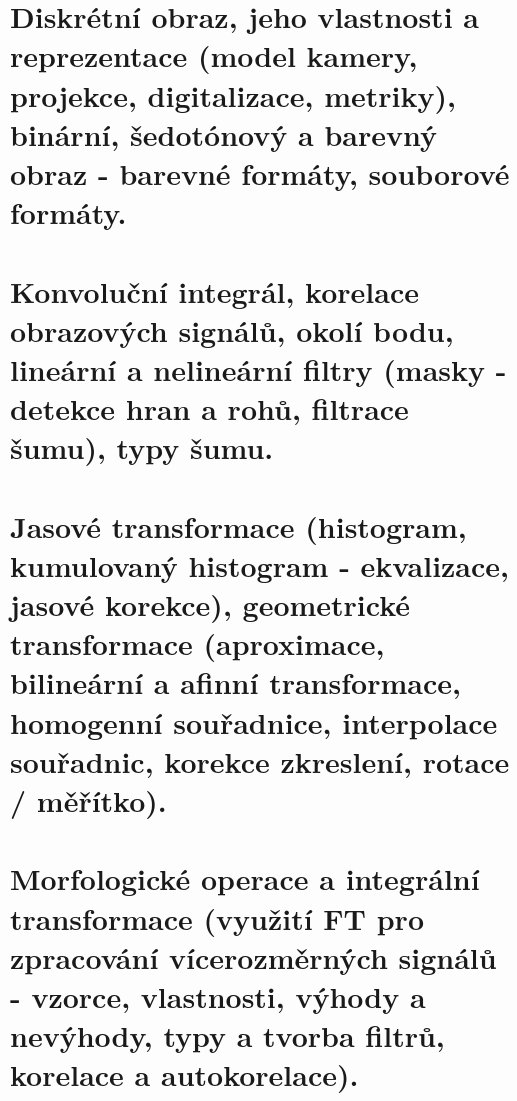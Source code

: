 \section{ Diskrétní obraz, jeho vlastnosti a reprezentace (model kamery, projekce, digitalizace, metriky), binární, šedotónový a
barevný obraz - barevné formáty, souborové formáty.}


\section{ Konvoluční integrál, korelace obrazových signálů, okolí bodu, lineární a nelineární filtry (masky - detekce hran a rohů,
filtrace šumu), typy šumu.}


\section{Jasové transformace (histogram, kumulovaný histogram - ekvalizace, jasové korekce), geometrické transformace
(aproximace, bilineární a afinní transformace, homogenní souřadnice, interpolace souřadnic, korekce zkreslení, rotace /
měřítko).}


\section{Morfologické operace a integrální transformace (využití FT pro zpracování vícerozměrných signálů - vzorce,
vlastnosti, výhody a nevýhody, typy a tvorba filtrů, korelace a autokorelace).}